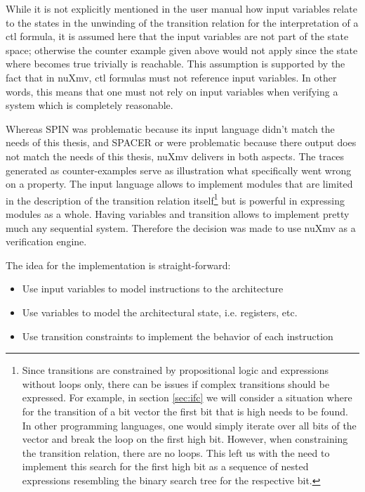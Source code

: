 \begin{example}
    While it is not explicitly mentioned in the user manual how input variables relate to the states in the unwinding of the transition relation for the interpretation of a \gls{ctl} formula, it is assumed here that the input variables are not part of the state space; otherwise the counter example given above would not apply since the state where  becomes true trivially is reachable.
    This assumption is supported by the fact that in nuXmv, \gls{ctl} formulas must not reference input variables.
    In other words, this means that one must not rely on input variables when verifying a system which is completely reasonable.
\end{example}

Whereas SPIN was problematic because its input language didn't match the needs of this thesis, and SPACER or \muZ{} were problematic because there output does not match the needs of this thesis, nuXmv delivers in both aspects.
The traces generated as counter-examples serve as illustration what specifically went wrong on a property.
The input language allows to implement modules that are limited in the description of the transition relation itself\footnote{%
    Since transitions are constrained by propositional logic and expressions without loops only, there can be issues if complex transitions should be expressed.
    For example, in section \ref{sec:ifc} we will consider a situation where for the transition of a bit vector the first bit that is high needs to be found.
    In other programming languages, one would simply iterate over all bits of the vector and break the loop on the first high bit.
    However, when constraining the transition relation, there are no loops.
    This left us with the need to implement this search for the first high bit as a sequence of nested  expressions resembling the binary search tree for the respective bit.
} but is powerful in expressing modules as a whole.
Having variables and transition allows to implement pretty much any sequential system.
Therefore the decision was made to use nuXmv as a verification engine.

The idea for the implementation is straight-forward:
\begin{itemize}
    \item Use input variables to model instructions to the architecture
    \item Use variables to model the architectural state, i.e. registers, etc.
    \item Use transition constraints to implement the behavior of each instruction
\end{itemize}

